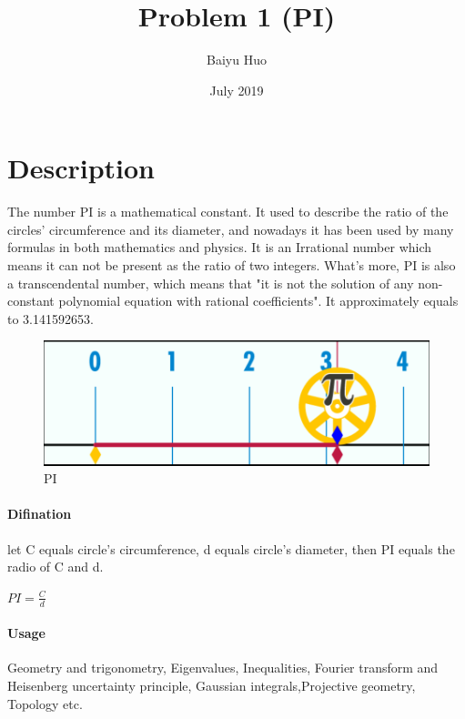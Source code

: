 \documentclass{article}
\title{Problem 1 (PI)}
\author{Baiyu Huo}
\date{July 2019}
\begin{document}
\maketitle

\section{Description}
The number PI is a mathematical constant. It used to describe the ratio of the circles' circumference and its diameter, and nowadays it has been used by many formulas in both mathematics and physics. It is an Irrational number which means it can not be present as the ratio of two integers. What's more, PI is also a transcendental number, which means that "it is not the solution of any non-constant polynomial equation with rational coefficients".\citep{wiki:pi} It approximately equals to 3.141592653.


\begin{figure}[h!]
\centering
\includegraphics[scale=0.2]{PI.png}
\caption{PI}
\label{fig:universe}
\end{figure}

\paragraph{Difination}
let C equals circle's circumference, d equals circle's diameter, then PI equals the radio of C and d.


\begin{center}
 $PI=\frac{C}{d}$
\end{center}

\paragraph{Usage} 
Geometry and trigonometry, Eigenvalues, Inequalities, Fourier transform and Heisenberg uncertainty principle, Gaussian integrals,Projective geometry, Topology etc.





\end{document}
